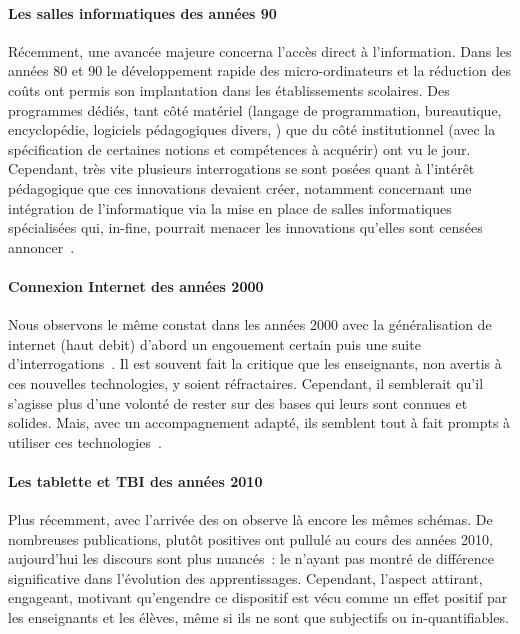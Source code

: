         \paragraph{Les salles informatiques des années 90}
            Récemment, une avancée majeure concerna l'accès direct à l'information. Dans les années 80 et 90 le développement rapide des micro-ordinateurs et la réduction des coûts ont permis son implantation dans les établissements scolaires. Des programmes dédiés, tant côté matériel (langage de programmation, bureautique, encyclopédie, logiciels pédagogiques divers, \etc) que du côté institutionnel (avec la spécification de certaines notions et compétences à acquérir) ont vu le jour. Cependant, très vite plusieurs interrogations se sont posées quant à l'intérêt pédagogique que ces innovations devaient créer, notamment concernant une intégration de l'informatique via la mise en place de salles informatiques spécialisées qui, in-fine, pourrait menacer les innovations qu'elles sont censées annoncer~.
        \paragraph{Connexion Internet des années 2000}
            Nous observons le même constat dans les années 2000 avec la généralisation de internet (haut debit) d'abord un engouement certain puis une suite d'interrogations~. Il est souvent fait la critique que les enseignants, non avertis à ces nouvelles technologies, y soient réfractaires. Cependant, il semblerait qu'il s'agisse plus d'une volonté de rester sur des bases qui leurs sont connues et solides. Mais, avec un accompagnement adapté, ils semblent tout à fait prompts à utiliser ces technologies~.
        \paragraph{Les tablette et TBI des années 2010}
            Plus récemment, avec l'arrivée des  on observe là encore les mêmes schémas. De nombreuses publications, plutôt positives ont pullulé au cours des années 2010, aujourd'hui les discours sont plus nuancés~: le  n'ayant pas montré de différence significative dans l'évolution des apprentissages. Cependant, l'aspect attirant, engageant, motivant qu'engendre ce dispositif est vécu comme un effet positif par les enseignants et les élèves, même si ils ne sont que subjectifs ou in-quantifiables.
